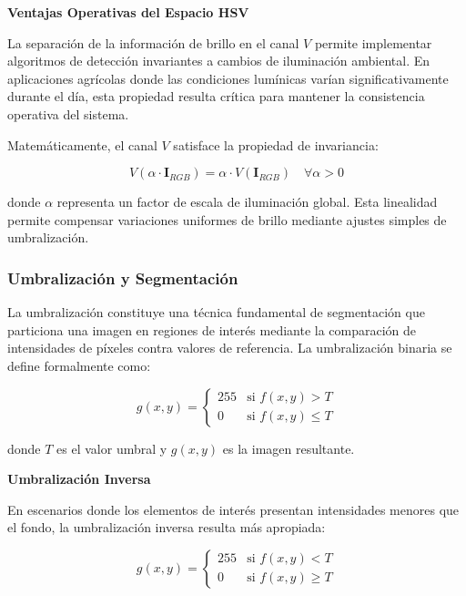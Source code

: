 \textbf{Ventajas Operativas del Espacio HSV}

La separación de la información de brillo en el canal $V$ permite implementar algoritmos de detección invariantes a cambios de iluminación ambiental. En aplicaciones agrícolas donde las condiciones lumínicas varían significativamente durante el día, esta propiedad resulta crítica para mantener la consistencia operativa del sistema.

Matemáticamente, el canal $V$ satisface la propiedad de invariancia:

\begin{equation}
V(\alpha \cdot \mathbf{I}_{RGB}) = \alpha \cdot V(\mathbf{I}_{RGB}) \quad \forall \alpha > 0
\end{equation}

donde $\alpha$ representa un factor de escala de iluminación global. Esta linealidad permite compensar variaciones uniformes de brillo mediante ajustes simples de umbralización.

\subsubsection{Umbralización y Segmentación}

La umbralización constituye una técnica fundamental de segmentación que particiona una imagen en regiones de interés mediante la comparación de intensidades de píxeles contra valores de referencia. La umbralización binaria se define formalmente como:

\begin{equation}
g(x,y) = \begin{cases}
255 & \text{si } f(x,y) > T \\
0 & \text{si } f(x,y) \leq T
\end{cases}
\end{equation}

donde $T$ es el valor umbral y $g(x,y)$ es la imagen resultante.

\textbf{Umbralización Inversa}

En escenarios donde los elementos de interés presentan intensidades menores que el fondo, la umbralización inversa resulta más apropiada:

\begin{equation}
g(x,y) = \begin{cases}
255 & \text{si } f(x,y) < T \\
0 & \text{si } f(x,y) \geq T
\end{cases}
\end{equation}

